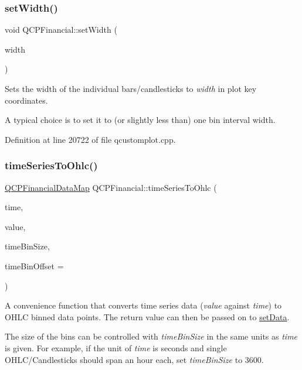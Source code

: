 \subsubsection{\texorpdfstring{set\+Width()}{setWidth()}}
{\footnotesize\ttfamily void Q\+C\+P\+Financial\+::set\+Width (\begin{DoxyParamCaption}\item[{double}]{width }\end{DoxyParamCaption})}

Sets the width of the individual bars/candlesticks to {\itshape width} in plot key coordinates.

A typical choice is to set it to (or slightly less than) one bin interval width. 

Definition at line 20722 of file qcustomplot.\+cpp.

\mbox{\label{class_q_c_p_financial_a0c3453d1c03e320950fdd2df54e3ebc8}} 
\subsubsection{\texorpdfstring{time\+Series\+To\+Ohlc()}{timeSeriesToOhlc()}}
{\footnotesize\ttfamily \hyperlink{qcustomplot_8h_a745c09823fae0974b50beca9bc3b3d7d}{Q\+C\+P\+Financial\+Data\+Map} Q\+C\+P\+Financial\+::time\+Series\+To\+Ohlc (\begin{DoxyParamCaption}\item[{const Q\+Vector$<$ double $>$ \&}]{time,  }\item[{const Q\+Vector$<$ double $>$ \&}]{value,  }\item[{double}]{time\+Bin\+Size,  }\item[{double}]{time\+Bin\+Offset = {} }\end{DoxyParamCaption})\hspace{0.3cm}{\ttfamily [static]}}

A convenience function that converts time series data ({\itshape value} against {\itshape time}) to O\+H\+LC binned data points. The return value can then be passed on to \hyperlink{class_q_c_p_financial_adf12a86082f1e488df6a4e8603f8fd6d}{set\+Data}.

The size of the bins can be controlled with {\itshape time\+Bin\+Size} in the same units as {\itshape time} is given. For example, if the unit of {\itshape time} is seconds and single O\+H\+L\+C/\+Candlesticks should span an hour each, set {\itshape time\+Bin\+Size} to 3600.

